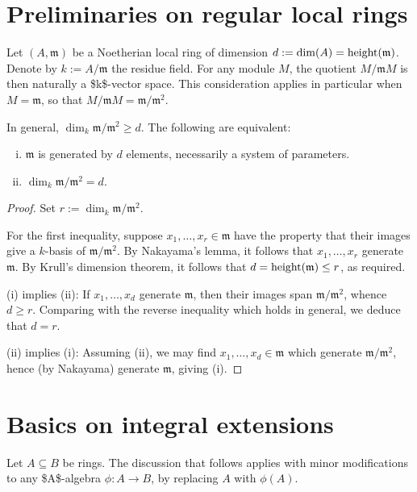\documentclass[10pt]{article}
\begin{document}
\section{Preliminaries on regular local rings}
\label{sec:org3fde1d4}

Let \((A,\mathfrak{m})\)  be a Noetherian local ring of dimension
\(d := \dim(A) = \operatorname{height}(\mathfrak{m})\).
Denote by \(k := A/\mathfrak{m}\) the residue field.
For any module \(M\),
the quotient \(M/\mathfrak{m} M\) is then naturally a \$k\$-vector
space.
This consideration applies in particular
when \(M = \mathfrak{m}\),
so that \(M / \mathfrak{m} M = \mathfrak{m} / \mathfrak{m}^2\).
\begin{lemma}
  In general,
  $\dim_k \mathfrak{m} / \mathfrak{m}^2 \geq d$.
  The following are equivalent:
  \begin{enumerate}[(i)]
  \item $\mathfrak{m}$ is generated by $d$ elements,
    necessarily a system of parameters.
  \item $\dim_{k} \mathfrak{m}/\mathfrak{m}^2 = d$.
  \end{enumerate}
\end{lemma}
\begin{proof}
  Set $r := \dim_k \mathfrak{m} / \mathfrak{m}^2$.

  For the first inequality,
  suppose $x_1,\dotsc,x_{r} \in \mathfrak{m}$
  have the property that their images give a $k$-basis of
  $\mathfrak{m} / \mathfrak{m}^2$.
  By Nakayama's lemma,
  it follows that $x_1,\dotsc,x_r$ generate $\mathfrak{m}$.
  By Krull's dimension theorem,
  it follows that $d = \operatorname{height}(\mathfrak{m}) \leq r$,
  as required.

  (i) implies (ii):
  If $x_1,\dotsc,x_d$ generate $\mathfrak{m}$,
  then their images span $\mathfrak{m}/\mathfrak{m}^2$,
  whence $d \geq r$.
  Comparing with the reverse inequality which holds in general,
  we deduce that $d = r$.

  (ii) implies (i):
  Assuming (ii),
  we may find $x_1,\dotsc,x_d \in \mathfrak{m}$ which generate
  $\mathfrak{m}/\mathfrak{m}^2$,
  hence (by Nakayama) generate $\mathfrak{m}$,
  giving (i).
\end{proof}

\section{Basics on integral extensions}
\label{sec:org4afff50}

Let \(A \subseteq B\) be rings.
The discussion that follows
applies with minor modifications to any \$A\$-algebra
\(\phi : A \rightarrow B\),
by replacing \(A\) with \(\phi(A)\).
\end{document}

